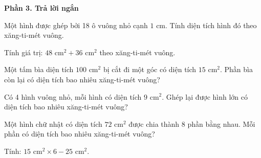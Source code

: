 \textbf{Phần 3. Trả lời ngắn}

\begin{ex} %
Một hình được ghép bởi 18 ô vuông nhỏ cạnh $1\text{ cm}$. Tính diện tích hình đó theo xăng-ti-mét vuông.
\end{ex}

\begin{ex} %
Tính giá trị: $48\text{ cm}^2 + 36\text{ cm}^2$ theo xăng-ti-mét vuông.
\end{ex}

\begin{ex} %
Một tấm bìa diện tích $100\text{ cm}^2$ bị cắt đi một góc có diện tích $15\text{ cm}^2$. Phần bìa còn lại có diện tích bao nhiêu xăng-ti-mét vuông?
\end{ex}

\begin{ex} %
Có 4 hình vuông nhỏ, mỗi hình có diện tích $9\text{ cm}^2$. Ghép lại được hình lớn có diện tích bao nhiêu xăng-ti-mét vuông?
\end{ex}

\begin{ex} %
Một hình chữ nhật có diện tích $72\text{ cm}^2$ được chia thành 8 phần bằng nhau. Mỗi phần có diện tích bao nhiêu xăng-ti-mét vuông?
\end{ex}

\begin{ex} %
Tính: $15\text{ cm}^2 \times 6 - 25\text{ cm}^2$.
\end{ex}
